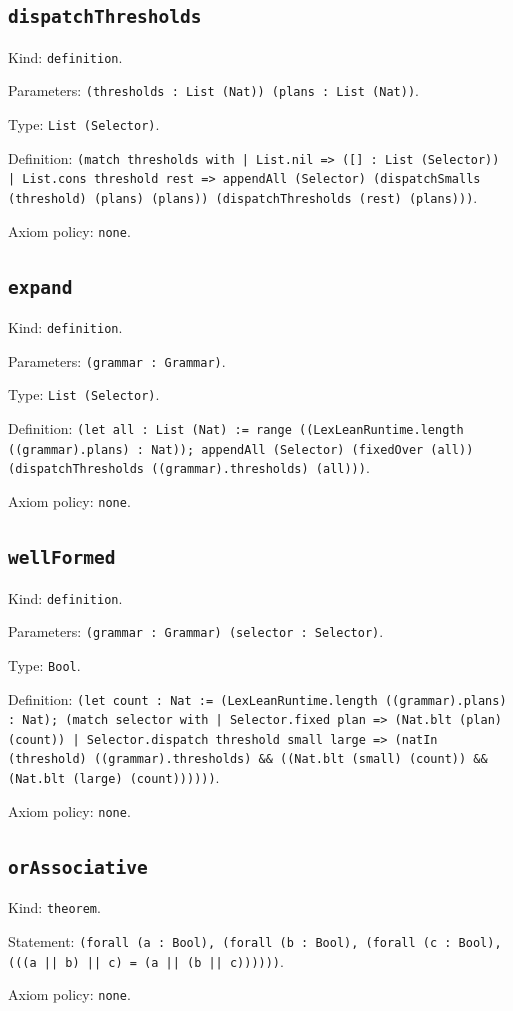 \documentclass[11pt]{article}
\begin{document}
\subsection*{\texttt{dispatchThresholds}}
\noindent Kind: \texttt{definition}.\par
\noindent Parameters: \texttt{(thresholds : List (Nat)) (plans : List (Nat))}.\par
\noindent Type: \texttt{List (Selector)}.\par
\noindent Definition: \texttt{(match thresholds with | List.nil => ([] : List (Selector)) | List.cons threshold rest => appendAll (Selector) (dispatchSmalls (threshold) (plans) (plans)) (dispatchThresholds (rest) (plans)))}.\par
\noindent Axiom policy: \texttt{none}.\par
\subsection*{\texttt{expand}}
\noindent Kind: \texttt{definition}.\par
\noindent Parameters: \texttt{(grammar : Grammar)}.\par
\noindent Type: \texttt{List (Selector)}.\par
\noindent Definition: \texttt{(let all : List (Nat) := range ((LexLeanRuntime.length ((grammar).plans) : Nat)); appendAll (Selector) (fixedOver (all)) (dispatchThresholds ((grammar).thresholds) (all)))}.\par
\noindent Axiom policy: \texttt{none}.\par
\subsection*{\texttt{wellFormed}}
\noindent Kind: \texttt{definition}.\par
\noindent Parameters: \texttt{(grammar : Grammar) (selector : Selector)}.\par
\noindent Type: \texttt{Bool}.\par
\noindent Definition: \texttt{(let count : Nat := (LexLeanRuntime.length ((grammar).plans) : Nat); (match selector with | Selector.fixed plan => (Nat.blt (plan) (count)) | Selector.dispatch threshold small large => (natIn (threshold) ((grammar).thresholds) \&\& ((Nat.blt (small) (count)) \&\& (Nat.blt (large) (count))))))}.\par
\noindent Axiom policy: \texttt{none}.\par
\subsection*{\texttt{orAssociative}}
\noindent Kind: \texttt{theorem}.\par
\noindent Statement: \texttt{(forall (a : Bool), (forall (b : Bool), (forall (c : Bool), (((a || b) || c) = (a || (b || c))))))}.\par
\noindent Axiom policy: \texttt{none}.\par
\end{document}
